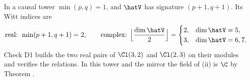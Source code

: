 In a causal tower $\min(p,q) = 1$, and $\hatV$ has signature $(p+1, q+1)$. Its Witt indices are
\[
\text{real: } \min(p+1, q+1) = 2, \qquad
\text{complex: } \Bigl\lfloor \frac{\dim\hatV}{2} \Bigr\rfloor =
\begin{cases} 2, & \dim\hatV = 5, \\ 3, & \dim\hatV = 6, 7. \end{cases}
\]
Check D1 builds the two real pairs of $\Cl(3,2)$ and $\Cl(2,3)$ on their modules and verifies the relations. In this tower and the mirror the field of (ii) is $\C$ by Theorem .
